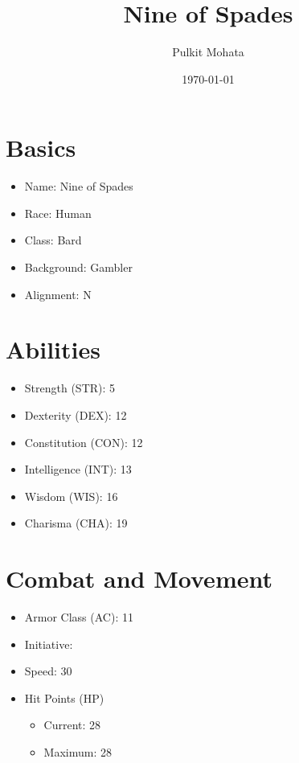\documentclass[11pt]{article}
\author{Pulkit Mohata}
\date{\today}
\title{Nine of Spades}
\begin{document}
\maketitle
\tableofcontents

\section{Basics}
\label{sec:org9434b90}
\begin{itemize}
\item Name: Nine of Spades
\item Race: Human
\item Class: Bard
\item Background: Gambler
\item Alignment: N
\end{itemize}
\section{Abilities}
\label{sec:org3218698}
\begin{itemize}
\item Strength (STR): 5
\item Dexterity (DEX): 12
\item Constitution (CON): 12
\item Intelligence (INT): 13
\item Wisdom (WIS): 16
\item Charisma (CHA): 19
\end{itemize}
\section{Combat and Movement}
\label{sec:org26e9764}
\begin{itemize}
\item Armor Class (AC): 11
\item Initiative:
\item Speed: 30
\item Hit Points (HP)
\begin{itemize}
\item Current: 28
\item Maximum: 28
\end{itemize}
\end{itemize}
\end{document}
